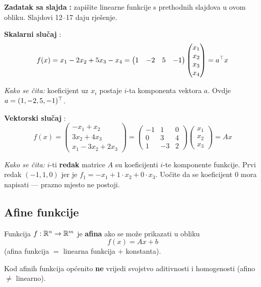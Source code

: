 \textbf{Zadatak sa slajda} \textbf{:} zapišite linearne funkcije s
prethodnih slajdova u ovom obliku. Slajdovi 12--17 daju rješenje.

\textbf{Skalarni slučaj} :
\[
f(x) = x_1 - 2x_2 + 5x_3 - x_4
= \begin{pmatrix} 1 & -2 & 5 & -1 \end{pmatrix}
  \begin{pmatrix} x_1 \\ x_2 \\ x_3 \\ x_4 \end{pmatrix}
= a^{\top} x
\]

\emph{Kako se čita:} koeficijent uz $x_i$ postaje $i$-ta komponenta vektora
$a$. Ovdje $a = (1, -2, 5, -1)^{\top}$.

\textbf{Vektorski slučaj} :
\[
f(x) = \begin{pmatrix} -x_1 + x_2 \\ 3x_2 + 4x_3 \\ x_1 - 3x_2 + 2x_3 \end{pmatrix}
= \begin{pmatrix}
-1 & 1 & 0 \\
 0 & 3 & 4 \\
 1 & -3 & 2 \end{pmatrix}
\begin{pmatrix} x_1 \\ x_2 \\ x_3 \end{pmatrix} = Ax
\]

\emph{Kako se čita:} $i$-ti \textbf{redak} matrice $A$ su koeficijenti $i$-te
komponente funkcije. Prvi redak $(-1, 1, 0)$ jer je
$f_1 = -x_1 + 1\cdot x_2 + 0\cdot x_3$. Uočite da se koeficijent $0$ mora
napisati --- prazno mjesto ne postoji.

\subsection{Afine funkcije}

\begin{definicija}
Funkcija $f : \mathbb{R}^n \to \mathbb{R}^m$ je \textbf{afina} ako se može prikazati u obliku
\[
f(x) = Ax + b
\]
(afina funkcija $=$ linearna funkcija $+$ konstanta).

Kod afinih funkcija općenito \textbf{ne} vrijedi svojstvo aditivnosti i
homogenosti (afino $\ne$ linearno).
\end{definicija}

